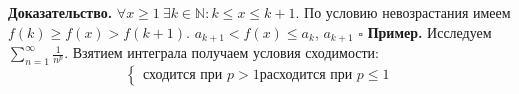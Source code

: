 \textbf{Доказательство.} $\forall x\geqslant1~\exists k\in\mathbb{N}:
k\leqslant x\leqslant k+1$.  По условию невозрастания имеем $f(k)\geqslant 
f(x)>f(k+1)$. $a_{k+1}<f(x)\leqslant a_k$,  $a_{k+1}$
$\square$ 
\textbf{Пример.} Исследуем $\sum\limits_{n=1}^{\infty} \frac{1}{n^p}$. Взятием
интеграла получаем условия сходимости:
$$
\begin{cases}
    \text{сходится при } p>1   
    \text{расходится при } p\leqslant 1
\end{cases}$$

